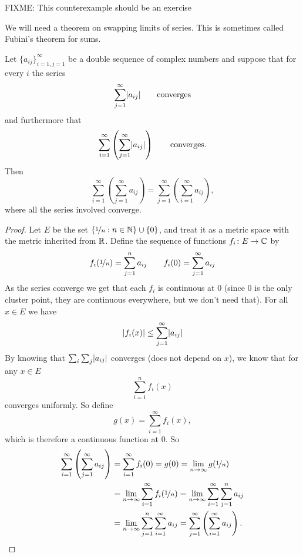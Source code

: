 FIXME: This counterexample should be an exercise

\medskip

We will need a theorem on swapping limits of series.  This is sometimes
called Fubini's theorem for sums.

\begin{thm} \label{thm:fubiniforsums}
Let $\{ a_{ij} \}_{i=1,j=1}^\infty$ be a double
sequence of complex numbers and suppose that for every $i$ the series
\begin{equation*}
\sum_{j=1}^\infty \lvert {a_{ij}} \rvert \qquad \text{converges}
\end{equation*}
and furthermore that
\begin{equation*}
\sum_{i=1}^\infty \left( \sum_{j=1}^\infty \lvert {a_{ij}} \rvert \right)
\qquad \text{converges}.
\end{equation*}
Then
\begin{equation*}
\sum_{i=1}^\infty \left( \sum_{j=1}^\infty a_{ij} \right)
=
\sum_{j=1}^\infty \left( \sum_{i=1}^\infty a_{ij} \right) ,
\end{equation*}
where all the series involved converge.
\end{thm}

\begin{proof}
Let $E$ be the set $\{ \nicefrac{1}{n} : n \in {\mathbb{N}} \} \cup \{ 0 \}$,
and treat it as a metric space with the metric inherited from ${\mathbb{R}}$.
Define the sequence of functions $f_i \colon E \to {\mathbb{C}}$
by
\begin{equation*}
f_i(\nicefrac{1}{n}) = \sum_{j=1}^n a_{ij}
\qquad
f_i(0) = \sum_{j=1}^\infty a_{ij}
\end{equation*}
As the series converge we get that each $f_i$ is continuous at $0$
(since 0 is the only cluster point, they are continuous everywhere, but
we don't need that).
For all $x \in E$ we have
\begin{equation*}
\lvert {f_i(x)} \rvert \leq \sum_{j=1}^\infty \lvert {a_{ij}} \rvert
\end{equation*}
By knowing that $\sum_i \sum_j \lvert {a_{ij}} \rvert$ converges (does not depend on
$x$), we know that for any $x \in E$
\begin{equation*}
\sum_{i=1}^n f_i(x)
\end{equation*}
converges uniformly.  So define
\begin{equation*}
g(x) = \sum_{i=1}^\infty f_i(x) ,
\end{equation*}
which is therefore a continuous function at $0$.
So
\begin{equation*}
\begin{split}
\sum_{i=1}^\infty \left( \sum_{j=1}^\infty a_{ij} \right)
& =
\sum_{i=1}^\infty f_i(0)
= g(0)
= \lim_{n\to\infty} g(\nicefrac{1}{n}) \\
&= 
\lim_{n\to\infty}\sum_{i=1}^\infty f_i(\nicefrac{1}{n})
= 
\lim_{n\to\infty}\sum_{i=1}^\infty \sum_{j=1}^n a_{ij} \\
&= 
\lim_{n\to\infty}\sum_{j=1}^n \sum_{i=1}^\infty a_{ij}
= 
\sum_{j=1}^\infty \left( \sum_{i=1}^\infty a_{ij} \right) . \qedhere
\end{split}
\end{equation*}
\end{proof}


